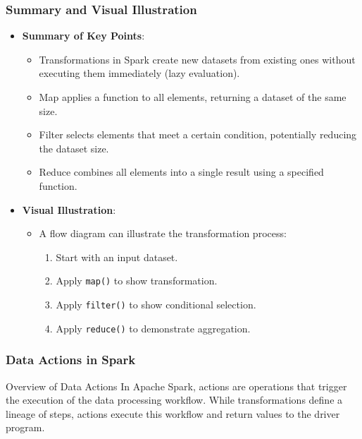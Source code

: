 \documentclass{beamer}
\begin{document}
\begin{frame}[fragile]
    \frametitle{Summary and Visual Illustration}
    \begin{itemize}
        \item \textbf{Summary of Key Points}:
            \begin{itemize}
                \item Transformations in Spark create new datasets from existing ones without executing them immediately (lazy evaluation).
                \item Map applies a function to all elements, returning a dataset of the same size.
                \item Filter selects elements that meet a certain condition, potentially reducing the dataset size.
                \item Reduce combines all elements into a single result using a specified function.
            \end{itemize}

        \item \textbf{Visual Illustration}:
            \begin{itemize}
                \item A flow diagram can illustrate the transformation process:
                \begin{enumerate}
                    \item Start with an input dataset.
                    \item Apply \texttt{map()} to show transformation.
                    \item Apply \texttt{filter()} to show conditional selection.
                    \item Apply \texttt{reduce()} to demonstrate aggregation.
                \end{enumerate}
            \end{itemize}
    \end{itemize}
\end{frame}

\begin{frame}
    \frametitle{Data Actions in Spark}
    \begin{block}{Overview of Data Actions}
        In Apache Spark, actions are operations that trigger the execution of the data processing workflow. 
        While transformations define a lineage of steps, actions execute this workflow and return values to the driver program.
    \end{block}
\end{frame}
\end{document}
